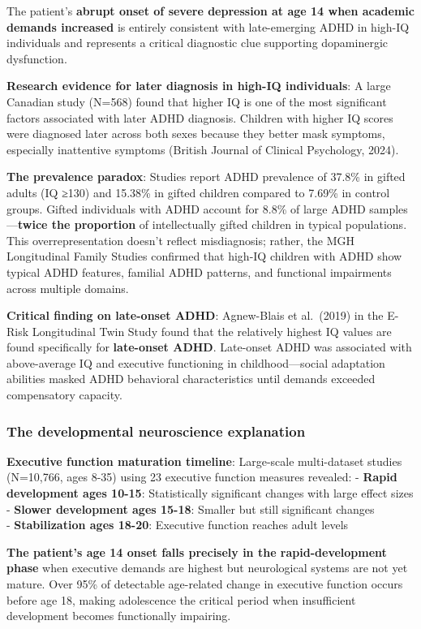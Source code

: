 The patient's \textbf{abrupt onset of severe depression at age 14 when academic demands increased} is entirely consistent with late-emerging ADHD in high-IQ individuals and represents a critical diagnostic clue supporting dopaminergic dysfunction.

\textbf{Research evidence for later diagnosis in high-IQ individuals}: A large Canadian study (N=568) found that higher IQ is one of the most significant factors associated with later ADHD diagnosis. Children with higher IQ scores were diagnosed later across both sexes because they better mask symptoms, especially inattentive symptoms (British Journal of Clinical Psychology, 2024).

\textbf{The prevalence paradox}: Studies report ADHD prevalence of 37.8\% in gifted adults (IQ ≥130) and 15.38\% in gifted children compared to 7.69\% in control groups. Gifted individuals with ADHD account for 8.8\% of large ADHD samples---\textbf{twice the proportion} of intellectually gifted children in typical populations. This overrepresentation doesn't reflect misdiagnosis; rather, the MGH Longitudinal Family Studies confirmed that high-IQ children with ADHD show typical ADHD features, familial ADHD patterns, and functional impairments across multiple domains.

\textbf{Critical finding on late-onset ADHD}: Agnew-Blais et al.~(2019) in the E-Risk Longitudinal Twin Study found that the relatively highest IQ values are found specifically for \textbf{late-onset ADHD}. Late-onset ADHD was associated with above-average IQ and executive functioning in childhood---social adaptation abilities masked ADHD behavioral characteristics until demands exceeded compensatory capacity.

\subsubsection{The developmental neuroscience explanation}\label{10a_trd_basis-the-developmental-neuroscience-explanation}

\textbf{Executive function maturation timeline}: Large-scale multi-dataset studies (N=10,766, ages 8-35) using 23 executive function measures revealed: - \textbf{Rapid development ages 10-15}: Statistically significant changes with large effect sizes - \textbf{Slower development ages 15-18}: Smaller but still significant changes\\
- \textbf{Stabilization ages 18-20}: Executive function reaches adult levels

\textbf{The patient's age 14 onset falls precisely in the rapid-development phase} when executive demands are highest but neurological systems are not yet mature. Over 95\% of detectable age-related change in executive function occurs before age 18, making adolescence the critical period when insufficient development becomes functionally impairing.

